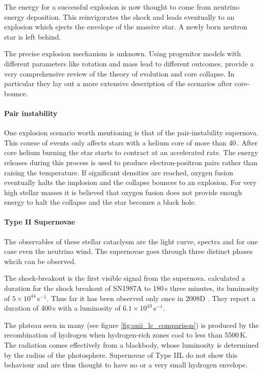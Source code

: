 The energy for a successful explosion is now thought to come from neutrino energy deposition. This reinvigorates the shock and leads eventually to an explosion which ejects the envelope of the massive star. A newly born neutron star is left behind.

The precise explosion mechanism is unknown. Using progenitor models with different parameters like rotation and mass lead to different outcomes. \citet{2002RvMP...74.1015W}provide a very comprehensive review of the theory of evolution and core collapse. In particular they lay out a more extensive description of the scenarios after core-bounce.

\paragraph{Pair instability}
One explosion scenario worth mentioning is that of the pair-instability supernova. This course of events only affects stars with a helium core of more than 40\,\msun. After core helium burning the star starts to contract at an accelerated rate. The energy releases during this process is used to produce electron-positron pairs rather than raising the temperature. If significant densities are reached, oxygen fusion eventually halts the implosion and the collapse bounces to an explosion. For very high stellar masses it is believed that oxygen fusion does not provide enough energy to halt the collapse and the star becomes a black hole.

\paragraph{Type II Supernovae}
The observables of these stellar cataclysm are the light curve, spectra and for one case even the neutrino wind. The supernovae goes through three distinct phases whcih can be observed. 

The shock-breakout is the first visible signal from the supernova.  \cite{1992ApJ...393..742E} calculated a duration for the  shock breakout of SN1987A to 180\,s three minutes, its  luminosity of $5\times10^{44}$\erg\,s$^{-1}$. 
Thus far it has been observed only once in 2008D \citep{2008Natur.453..469S}. They report a duration of 400\,s with a luminosity of $6.1\times10^{43}$\erg\,s$^{-1}$.

The plateau seen in many \snii (see figure \ref{fig:snii_lc_comparison}) is produced by the recombination of hydrogen when hydrogen-rich zones cool to less than 5500\,K. The radiation comes effectively from a blackbody, whose luminosity is determined  by the radius of the photosphere.
Supernovae of Type IIL do not show this behaviour and are thus thought to have no or a very small hydrogen envelope.

